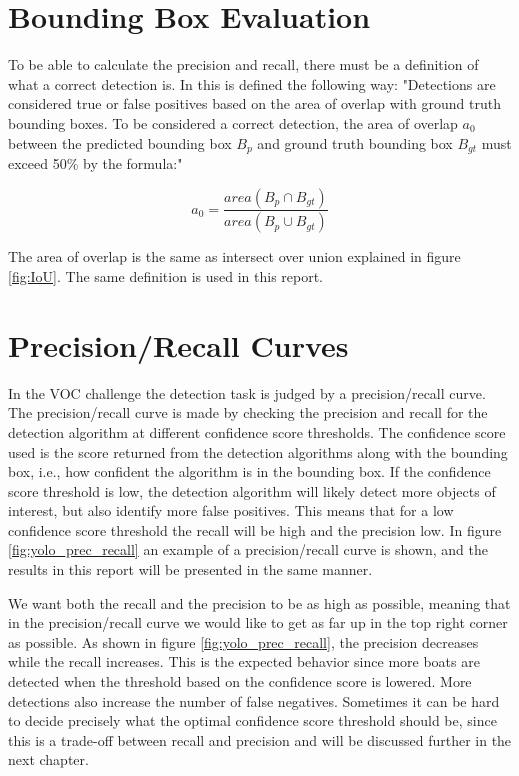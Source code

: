 \newpage

\section{Bounding Box Evaluation}
To be able to calculate the precision and recall, there must be a definition of what a correct detection is. In \citep{Everinghama} this is defined the following way: "Detections are considered true or false positives based on the area of overlap
with ground truth bounding boxes. To be considered a correct detection, the area of overlap $a_0$ between the predicted bounding box $B_p$ and ground truth bounding box $B_{gt}$ must exceed 50\% by the formula:"

\begin{equation*}
    a_0 = \frac{area(B_p \cap B_{gt}) }{area(B_p \cup B_{gt})}
\end{equation*}

The area of overlap is the same as intersect over union explained in figure \ref{fig:IoU}. The same definition is used in this report.




\section{Precision/Recall Curves}

In the VOC challenge \citep{Everinghama} the detection task is judged by a precision/recall curve. The precision/recall curve is made by checking the precision and recall for the detection algorithm at different confidence score thresholds. The confidence score used is the score returned from the detection algorithms along with the bounding box, i.e., how confident the algorithm is in the bounding box. If the confidence score threshold is low, the detection algorithm will likely detect more objects of interest, but also identify more false positives. This means that for a low confidence score threshold the recall will be high and the precision low. In figure \ref{fig:yolo_prec_recall} an example of a precision/recall curve is shown, and the results in this report will be presented in the same manner. 

\vspace{3mm}

We want both the recall and the precision to be as high as possible, meaning that in the precision/recall curve we would like to get as far up in the top right corner as possible. As shown in figure \ref{fig:yolo_prec_recall}, the precision decreases while the recall increases. This is the expected behavior since more boats are detected when the threshold based on the confidence score is lowered. More detections also increase the number of false negatives. Sometimes it can be hard to decide precisely what the optimal confidence score threshold should be, since this is a trade-off between recall and precision and will be discussed further in the next chapter. 

